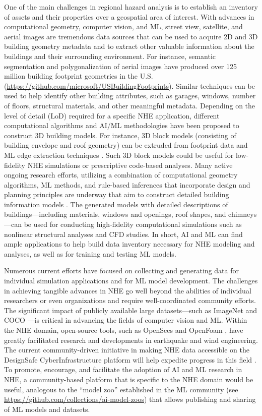 One of the main challenges in regional hazard analysis is to establish an inventory of assets and their properties over a geospatial area of interest. With advances in computational geometry, computer vision, and ML, street view, satellite, and aerial images are tremendous data sources that can be used to acquire 2D and 3D building geometry metadata and to extract other valuable information about the buildings and their surrounding environment. For instance, semantic segmentation and polygonalization of aerial images have produced over 125 million building footprint geometries in the U.S. (\url{https://github.com/microsoft/USBuildingFootprints}). Similar techniques can be used to help identify other building attributes, such as garages, windows, number of floors, structural materials, and other meaningful metadata. Depending on the level of detail (LoD) required for a specific NHE application, different computational algorithms and AI/ML methodologies have been proposed to construct 3D building models. For instance, 3D block models (consisting of building envelope and roof geometry) can be extruded from footprint data and ML edge extraction techniques \citep{maninis2017convolutional, yu2017casenet}. Such 3D block models could be useful for low-fidelity NHE simulations or prescriptive code-based analyses. Many active ongoing research efforts, utilizing a combination of computational geometry algorithms, ML methods, and rule-based inferences that incorporate design and planning principles are underway that aim to construct detailed building information models \citep{martinovic20153d, chen2018automatic}. The generated models with detailed descriptions of buildings---including materials, windows and openings, roof shapes, and chimneys---can be used for conducting high-fidelity computational simulations such as nonlinear structural analyses and CFD studies. In short, AI and ML can find ample applications to help build data inventory necessary for NHE modeling and analyses, as well as for training and testing ML models. 

Numerous current efforts have focused on collecting and generating data for individual simulation applications and for ML model development. The challenges in achieving tangible advances in NHE go well beyond the abilities of individual researchers or even organizations and require well-coordinated community efforts. The significant impact of publicly available large datasets---such as ImageNet \citep{deng2009imagenet} and COCO \citep{lin2014microsoft}---is critical in advancing the fields of computer vision and ML. Within the NHE domain, open-source tools, such as OpenSees \citep{mckenna2011opensees} and OpenFoam \citep{chen2014openfoam}, have greatly facilitated research and developments in earthquake and wind engineering. The current community-driven initiative in making NHE data accessible on the DesignSafe CyberInfrastructure platform will help expedite progress in this field \citep{rathje2017designsafe}. To promote, encourage, and facilitate the adoption of AI and ML research in NHE, a community-based platform that is specific to the NHE domain would be useful, analogous to the ``model zoo'' established in the ML community (see \url{https://github.com/collections/ai-model-zoos}) that allows publishing and sharing of ML models and datasets.

